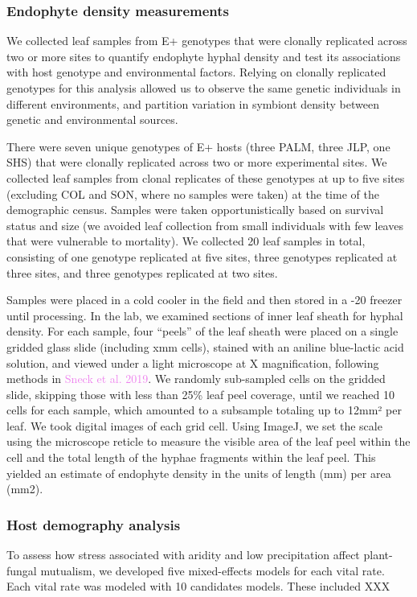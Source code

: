 \documentclass[11pt]{article}
\begin{document}
\subsubsection*{Endophyte density measurements}
We collected leaf samples from E+ genotypes that were clonally replicated across two or more sites to quantify endophyte hyphal density and test its associations with host genotype and environmental factors. 
Relying on clonally replicated genotypes for this analysis allowed us to observe the same genetic individuals in different environments, and partition variation in symbiont density between genetic and environmental sources. 

There were seven unique genotypes of E+ hosts (three PALM, three JLP, one SHS) that were clonally replicated across two or more experimental sites. 
We collected leaf samples from clonal replicates of these genotypes at up to five sites (excluding COL and SON, where no samples were taken) at the time of the demographic census.
Samples were taken opportunistically based on survival status and size (we avoided leaf collection from small individuals with few leaves that were vulnerable to mortality).
We collected 20 leaf samples in total, consisting of one genotype replicated at five sites, three genotypes replicated at three sites, and three genotypes replicated at two sites. 

Samples were placed in a cold cooler in the field and then stored in a -20 freezer until processing.
In the lab, we examined sections of inner leaf sheath for hyphal density. 
For each sample, four “peels” of the leaf sheath were placed on a single gridded glass slide (including xmm cells), stained with an aniline blue-lactic acid solution, and viewed under a light microscope at X magnification, following methods in \textcolor{violet}{Sneck et al. 2019}. 
We randomly sub-sampled cells on the gridded slide, skipping those with less than 25\% leaf peel coverage, until we reached 10 cells for each sample, which amounted to a subsample totaling up to 12mm² per leaf.
We took digital images of each grid cell. 
Using ImageJ, we set the scale using the microscope reticle to measure the visible area of the leaf peel within the cell and the total length of the hyphae fragments within the leaf peel.
This yielded an estimate of endophyte density in the units of length (mm) per area (mm2). 

\subsubsection*{Host demography analysis}
To assess how stress associated with aridity and low precipitation affect plant-fungal mutualism, we developed five mixed-effects models for each vital rate. 
Each vital rate was modeled with 10 candidates models. 
These included XXX
\end{document}
